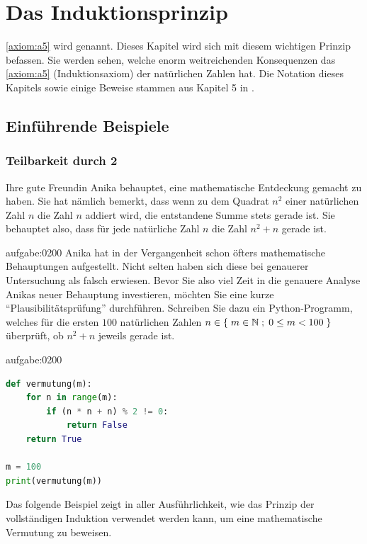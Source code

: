 \chapter{Das Induktionsprinzip}\label{ch:Kapitel02}

\cref{axiom:a5} wird  genannt. Dieses Kapitel wird sich mit diesem wichtigen Prinzip befassen.
Sie werden sehen, welche enorm weitreichenden Konsequenzen das \cref{axiom:a5} (Induktionsaxiom) der natürlichen Zahlen hat. Die Notation dieses Kapitels sowie einige Beweise stammen aus Kapitel 5 in \cite{AmannEscher1}.

\section{Einführende Beispiele}

\subsection{Teilbarkeit durch 2}
Ihre gute Freundin Anika behauptet, eine mathematische Entdeckung gemacht zu haben. Sie hat nämlich bemerkt, dass wenn zu dem Quadrat $n^2$ einer natürlichen Zahl $n$ die Zahl $n$ addiert wird, die entstandene Summe stets gerade ist. Sie behauptet also, dass für jede natürliche Zahl $n$ die Zahl $n^2+n$ gerade ist.

\begin{aufgabe}{aufgabe:0200}
Anika hat in der Vergangenheit schon öfters mathematische Behauptungen aufgestellt. Nicht selten haben sich diese bei genauerer Untersuchung als falsch erwiesen. Bevor Sie also viel Zeit in die genauere Analyse Anikas neuer Behauptung investieren, möchten Sie eine kurze \enquote{Plausibilitätsprüfung} durchführen. Schreiben Sie dazu ein Python-Programm, welches für die ersten $100$ natürlichen Zahlen $n\in\left\{\;m\in\mathbb{N} \; ; \; 0\leq m < 100 \;\right\}$ überprüft, ob $n^2+n$ jeweils gerade ist.
\end{aufgabe}
\begin{antwort}{aufgabe:0200}
\begin{lstlisting}[language=Python,caption=Vermutung überprüfen]
def vermutung(m):
    for n in range(m):
        if (n * n + n) % 2 != 0:
            return False
    return True

m = 100
print(vermutung(m))
\end{lstlisting}
\end{antwort}

\noindent
Das folgende Beispiel zeigt in aller Ausführlichkeit, wie das Prinzip der vollständigen Induktion verwendet werden kann, um eine mathematische Vermutung zu beweisen.

